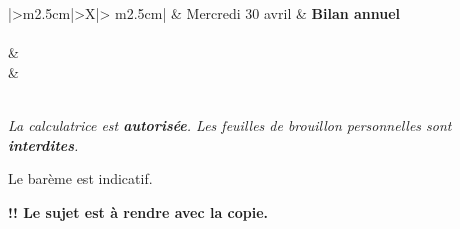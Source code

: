 \documentclass[11pt,french]{article}
\begin{document}
\begin{center}
\begin{tabularx}{\textwidth}{|>\centering m{2.5cm}|>\centering X|>{\centering\arraybackslash} m{2.5cm}|}
	\iere {} &  Mercredi 30 avril  & \textbf{Bilan annuel} \\
	\hline
		 \\
	\hline
         &  \\
		 &  \\
	\hline
         \\[1cm]
    \hline
\end{tabularx}\bigskip

{\itshape
La calculatrice est \textbf{autorisée}. Les feuilles de brouillon personnelles sont \textbf{interdites}.\par
Le barème est indicatif.\par
\textbf{ !! Le sujet est à rendre avec la copie.}
}
\end{center}

\end{document}

